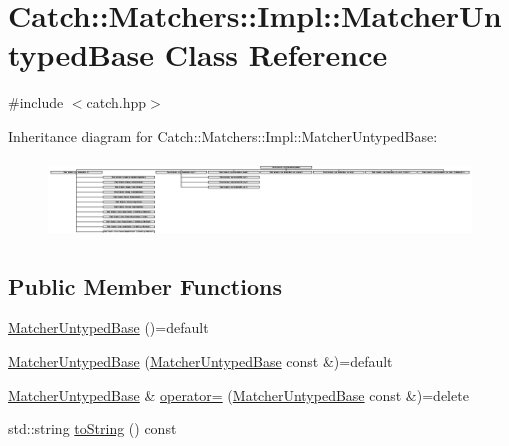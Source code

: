 \hypertarget{class_catch_1_1_matchers_1_1_impl_1_1_matcher_untyped_base}{}\section{Catch\+:\+:Matchers\+:\+:Impl\+:\+:Matcher\+Untyped\+Base Class Reference}
\label{class_catch_1_1_matchers_1_1_impl_1_1_matcher_untyped_base}


{\ttfamily \#include $<$catch.\+hpp$>$}

Inheritance diagram for Catch\+:\+:Matchers\+:\+:Impl\+:\+:Matcher\+Untyped\+Base\+:\begin{figure}[H]
\begin{center}
\leavevmode
\includegraphics[height=2.041667cm]{class_catch_1_1_matchers_1_1_impl_1_1_matcher_untyped_base}
\end{center}
\end{figure}
\subsection*{Public Member Functions}
\begin{DoxyCompactItemize}
\item 
\mbox{\hyperlink{class_catch_1_1_matchers_1_1_impl_1_1_matcher_untyped_base_ab65764dc245d85e2b268d3be870b650a}{Matcher\+Untyped\+Base}} ()=default
\item 
\mbox{\hyperlink{class_catch_1_1_matchers_1_1_impl_1_1_matcher_untyped_base_a985fd3c3ffcc9f2e8dc7a330130040b0}{Matcher\+Untyped\+Base}} (\mbox{\hyperlink{class_catch_1_1_matchers_1_1_impl_1_1_matcher_untyped_base}{Matcher\+Untyped\+Base}} const \&)=default
\item 
\mbox{\hyperlink{class_catch_1_1_matchers_1_1_impl_1_1_matcher_untyped_base}{Matcher\+Untyped\+Base}} \& \mbox{\hyperlink{class_catch_1_1_matchers_1_1_impl_1_1_matcher_untyped_base_a62668ccc47b64a9094dcb6413f9af80b}{operator=}} (\mbox{\hyperlink{class_catch_1_1_matchers_1_1_impl_1_1_matcher_untyped_base}{Matcher\+Untyped\+Base}} const \&)=delete
\item 
std\+::string \mbox{\hyperlink{class_catch_1_1_matchers_1_1_impl_1_1_matcher_untyped_base_a5982c7c80ca71dfe2298babadad7a453}{to\+String}} () const
\end{DoxyCompactItemize}
